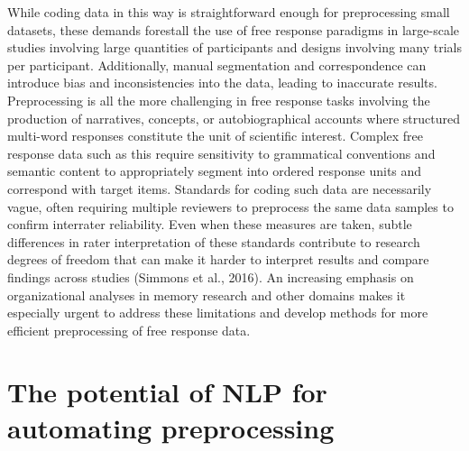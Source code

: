 \documentclass[
  letterpaper,
  DIV=11,
  numbers=noendperiod]{scrreprt}
\begin{document}
While coding data in this way is straightforward enough for
preprocessing small datasets, these demands forestall the use of free
response paradigms in large-scale studies involving large quantities of
participants and designs involving many trials per participant.
Additionally, manual segmentation and correspondence can introduce bias
and inconsistencies into the data, leading to inaccurate results.
Preprocessing is all the more challenging in free response tasks
involving the production of narratives, concepts, or autobiographical
accounts where structured multi-word responses constitute the unit of
scientific interest. Complex free response data such as this require
sensitivity to grammatical conventions and semantic content to
appropriately segment into ordered response units and correspond with
target items. Standards for coding such data are necessarily vague,
often requiring multiple reviewers to preprocess the same data samples
to confirm interrater reliability. Even when these measures are taken,
subtle differences in rater interpretation of these standards contribute
to research degrees of freedom that can make it harder to interpret
results and compare findings across studies (Simmons et al., 2016). An
increasing emphasis on organizational analyses in memory research and
other domains makes it especially urgent to address these limitations
and develop methods for more efficient preprocessing of free response
data.

\begin{tcolorbox}[enhanced jigsaw, leftrule=.75mm, arc=.35mm, breakable, coltitle=black, toprule=.15mm, colback=white, left=2mm, colbacktitle=quarto-callout-caution-color!10!white, opacityback=0, colframe=quarto-callout-caution-color-frame, bottomtitle=1mm, titlerule=0mm, toptitle=1mm, bottomrule=.15mm, rightrule=.15mm, title=\textcolor{quarto-callout-caution-color}{\faFire}\hspace{0.5em}{TODO: Above needs citations documenting the obstruction and the
importance of clearing it, probably findable by locating other efforts
at automating coding.}, opacitybacktitle=0.6]

\end{tcolorbox}

\hypertarget{the-potential-of-nlp-for-automating-preprocessing}{%
\section{The potential of NLP for automating
preprocessing}\label{the-potential-of-nlp-for-automating-preprocessing}}
\end{document}
